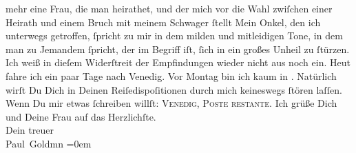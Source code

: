 \begin{ledgroupsized}[t]{13cm}
               mehr eine Frau, die man heirathet, und der mich vor die Wahl zwiſchen einer Heirath
               und einem Bruch mit meinem Schwager ſtellt{\dotstwo} Mein Onkel, den ich unterwegs getroffen, ſpricht
               zu mir\strikeout{, \textcolor{gray}{dem}} in dem milden und mitleidigen Tone, in dem man zu Jemandem ſpricht, der im
               Begriff iſt, ſich in ein großes Unheil zu ſtürzen. Ich weiß in dieſem {\pb}Widerſtreit der Empfindungen wieder nicht aus noch
               ein.\pend
           \pstart
           Heut fahre ich ein paar Tage nach Venedig. Vor Montag bin ich kaum
               in \label{K_L03386-4v}\label{K_L03386-4h}. Natürlich wirſt Du Dich in
               Deinen Reiſedispoſitionen durch mich keineswegs ſtören laſſen. Wenn Du mir etwas
               ſchreiben willſt: \textsc{Venedig, Poste restante}.\pend
           \pstart
           Ich grüße Dich und Deine Frau auf das Herzlichſte. {\\[\baselineskip]}Dein treuer {\\[\baselineskip]}\spacefill\mbox{Paul Goldmn}\pend
           \leftskip=0em{}
         
         \endnumbering{}\end{ledgroupsized}  \newcommand{\dateiname}{L03386}\newcommand{\titel}{Paul Goldmann an Arthur Schnitzler, 7. 9. 1903}\newcommand{\editorInnen}{Martin Anton Müller und Laura Untner}
      